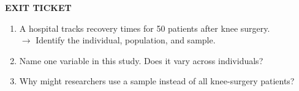 \documentclass[aspectratio=169, 11pt]{beamer}
\begin{document}
{
\begin{frame}[t, plain]
  \vspace{0.45cm}\par
  \hspace{0.55cm}%
  \begin{minipage}{0.9\textwidth}
    {\color{goldacc}\bfseries\footnotesize\MakeUppercase{Exit Ticket}}
    \vspace{0.55cm}\par
    \small
    \begin{enumerate}
      \setlength{\itemsep}{0.55em}\setlength{\topsep}{0em}
      \item {\color{white}A hospital tracks recovery times for 50 patients
        after knee surgery.\\
        $\rightarrow$ Identify the individual, population, and sample.}
      \item {\color{white}Name one variable in this study. Does it vary
        across individuals?}
      \item {\color{white}Why might researchers use a sample instead of all
        knee-surgery patients?}
    \end{enumerate}
  \end{minipage}
\end{frame}
}
\end{document}
